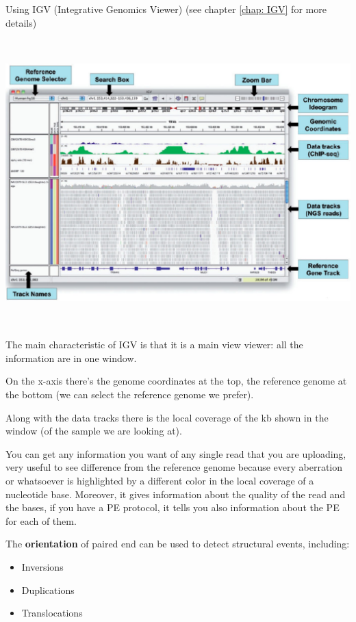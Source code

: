 Using IGV (Integrative Genomics Viewer) (see chapter \ref{chap: IGV} for more
details)

\includegraphics[width=6.32631in,height=4.35875in]{image19.jpeg}

The main characteristic of IGV is that it is a main view viewer: all the
information are in one window.

On the x-axis there's the genome coordinates at the top, the reference genome at
the bottom (we can select the reference genome we prefer).

Along with the data tracks there is the local coverage of the kb shown in the
window (of the sample we are looking at).

You can get any information you want of any single read that you are uploading,
very useful to see difference from the reference genome because every aberration
or whatsoever is highlighted by a different color in the local coverage of a
nucleotide base. Moreover, it gives information about the quality of the read
and the bases, if you have a PE protocol, it tells you also information about
the PE for each of them.

The \textbf{orientation} of paired end can be used to detect structural events,
including: 

\begin{itemize}
  \item Inversions
  \item Duplications
  \item Translocations
\end{itemize}


